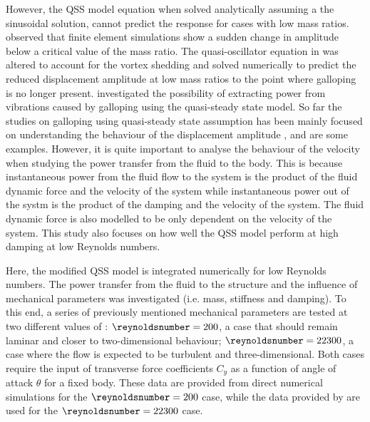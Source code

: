 However, the QSS model equation when solved analytically assuming a the sinusoidal solution, cannot predict the response for cases with low mass ratios. \citet{Joly2012} observed that finite element simulations show a sudden change in amplitude below a critical value of the mass ratio. The quasi-oscillator equation in \citet{Parkinson1964} was altered to account for the vortex shedding and solved numerically to predict the reduced displacement amplitude at low mass ratios to the point where galloping is no longer present. \citet{Barrero-Gil2010a} investigated the possibility of extracting power from vibrations caused by galloping using the quasi-steady state model. So far the studies on galloping using quasi-steady state assumption has been mainly focused on understanding the behaviour of the displacement amplitude \cite{Parkinson1964}, \cite{Joly2012} and \cite{Luo2003} are some examples. However, it is quite important to analyse the behaviour of the velocity when studying the power transfer from the fluid to the body. This is because instantaneous power from the fluid flow to the system is the product of the fluid dynamic force and the velocity of the system while instantaneous power out of the systm is the product of the damping and the velocity of the system. The fluid dynamic force is also modelled to be only dependent on the velocity of the system. This study also focuses on how well the QSS model perform at high damping at low Reynolds numbers. 


Here, the modified QSS model is integrated numerically for low Reynolds numbers. The power transfer from the fluid to the structure and the influence of mechanical parameters was investigated (i.e. mass, stiffness and damping). To this end, a series of previously mentioned mechanical parameters are tested at two different values of \reynoldsnumber: $\reynoldsnumber = 200$, a case that should remain laminar and closer to two-dimensional behaviour; $\reynoldsnumber = 22300$, a case where the flow is expected to be turbulent and three-dimensional. Both cases require the input of transverse force coefficients $C_y$ as a function of angle of attack $\theta$ for a fixed body. These data are provided from direct numerical simulations for the $\reynoldsnumber = 200$ case, while the data provided by \citet{Parkinson1964} are used for the $\reynoldsnumber = 22300$ case.

